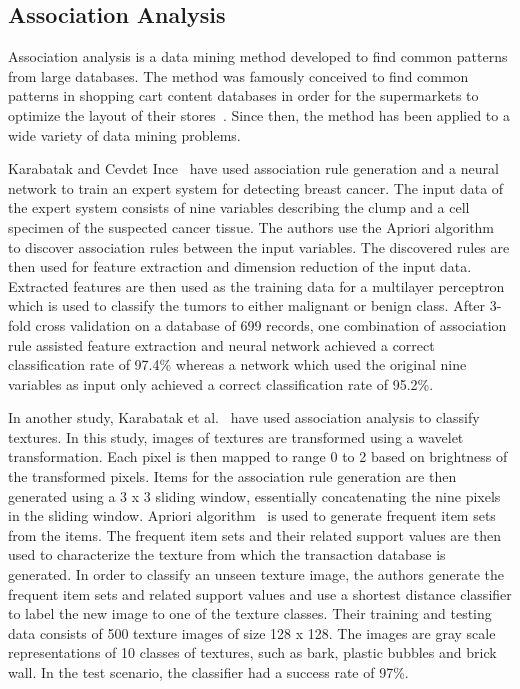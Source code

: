 \subsection{Association Analysis}

Association analysis is a data mining method developed to find common patterns from large databases. The method was famously conceived to find common patterns in shopping cart content databases in order for the supermarkets to optimize the layout of their stores~\cite{Agrawal:1993:MAR:170036.170072}. Since then, the method has been applied to a wide variety of data mining problems.

Karabatak and Cevdet Ince~\cite{KARABATAK20093465} have used association rule generation and a neural network to train an expert system for detecting breast cancer. The input data of the expert system consists of nine variables describing the clump and a cell specimen of the suspected cancer tissue. The authors use the Apriori algorithm~\cite{Agrawal94fastalgorithms} to discover association rules between the input variables. The discovered rules are then used for feature extraction and dimension reduction of the input data. Extracted features are then used as the training data for a multilayer perceptron which is used to classify the tumors to either malignant or benign class. After 3-fold cross validation on a database of 699 records, one combination of association rule assisted feature extraction and neural network achieved a correct classification rate of 97.4\% whereas a network which used the original nine variables as input only achieved a correct classification rate of 95.2\%.

In another study, Karabatak et al.~\cite{KARABATAK201132} have used association analysis to classify textures. In this study, images of textures are transformed using a wavelet transformation. Each pixel is then mapped to range 0 to 2 based on brightness of the transformed pixels. Items for the association rule generation are then generated using a 3 x 3 sliding window, essentially concatenating the nine pixels in the sliding window. Apriori algorithm~\cite{Agrawal94fastalgorithms} is used to generate frequent item sets from the items. The frequent item sets and their related support values are then used to characterize the texture from which the transaction database is generated. In order to classify an unseen texture image, the authors generate the frequent item sets and related support values and use a shortest distance classifier to label the new image to one of the texture classes. Their training and testing data consists of 500 texture images of size 128 x 128. The images are gray scale representations of 10 classes of textures, such as bark, plastic bubbles and brick wall. In the test scenario, the classifier had a success rate of 97\%. 